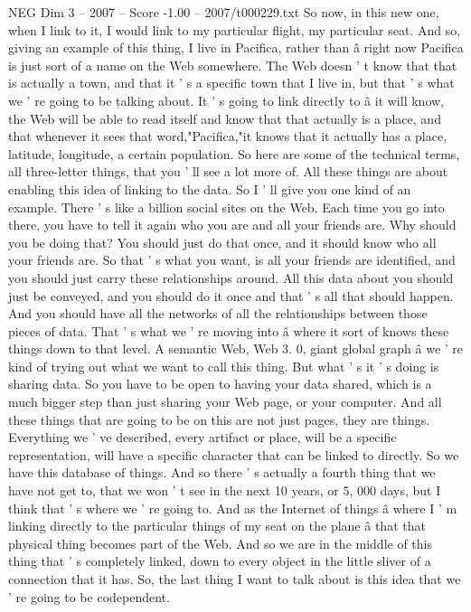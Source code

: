 \begin{textsample}{NEG Dim 3 – 2007 – Score -1.00 – 2007/t000229.txt}
So now, in this new one, when I link to it, I would link to my particular flight, my particular seat.
And so, giving an example of this thing, I live in Pacifica, rather than â right now Pacifica is just sort of a name on the Web somewhere.
The Web doesn ' t know that that is actually a town, and that it ' s a specific town that I live in, but that ' s what we ' re going to be talking about.
It ' s going to link directly to â it will know, the Web will be able to read itself and know that that actually is a place, and that whenever it sees that word,"Pacifica,"it knows that it actually has a place, latitude, longitude, a certain population.
So here are some of the technical terms, all three-letter things, that you ' ll see a lot more of.
All these things are about enabling this idea of linking to the data.
So I ' ll give you one kind of an example.
There ' s like a billion social sites on the Web.
Each time you go into there, you have to tell it again who you are and all your friends are.
Why should you be doing that?
You should just do that once, and it should know who all your friends are.
So that ' s what you want, is all your friends are identified, and you should just carry these relationships around.
All this data about you should just be conveyed, and you should do it once and that ' s all that should happen.
And you should have all the networks of all the relationships between those pieces of data.
That ' s what we ' re moving into â where it sort of knows these things down to that level.
A semantic Web, Web 3. 0, giant global graph â we ' re kind of trying out what we want to call this thing.
But what ' s it ' s doing is sharing data.
So you have to be open to having your data shared, which is a much bigger step than just sharing your Web page, or your computer.
And all these things that are going to be on this are not just pages, they are things.
Everything we ' ve described, every artifact or place, will be a specific representation, will have a specific character that can be linked to directly.
So we have this database of things.
And so there ' s actually a fourth thing that we have not get to, that we won ' t see in the next 10 years, or 5, 000 days, but I think that ' s where we ' re going to.
And as the Internet of things â where I ' m linking directly to the particular things of my seat on the plane â that that physical thing becomes part of the Web.
And so we are in the middle of this thing that ' s completely linked, down to every object in the little sliver of a connection that it has.
So, the last thing I want to talk about is this idea that we ' re going to be codependent.

\end{textsample}
